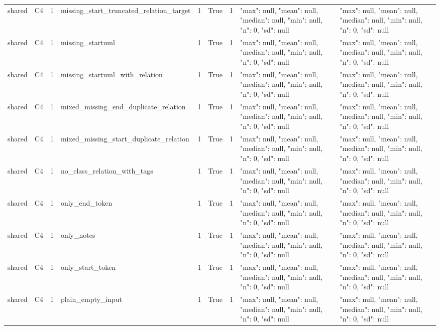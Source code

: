 \begin{tabular}{lllllllll}
shared & C4 & 1 & missing\_start\_truncated\_relation\_target & 1 & True & 1 & {"max": null, "mean": null, "median": null, "min": null, "n": 0, "sd": null} & {"max": null, "mean": null, "median": null, "min": null, "n": 0, "sd": null} \\
shared & C4 & 1 & missing\_startuml & 1 & True & 1 & {"max": null, "mean": null, "median": null, "min": null, "n": 0, "sd": null} & {"max": null, "mean": null, "median": null, "min": null, "n": 0, "sd": null} \\
shared & C4 & 1 & missing\_startuml\_with\_relation & 1 & True & 1 & {"max": null, "mean": null, "median": null, "min": null, "n": 0, "sd": null} & {"max": null, "mean": null, "median": null, "min": null, "n": 0, "sd": null} \\
shared & C4 & 1 & mixed\_missing\_end\_duplicate\_relation & 1 & True & 1 & {"max": null, "mean": null, "median": null, "min": null, "n": 0, "sd": null} & {"max": null, "mean": null, "median": null, "min": null, "n": 0, "sd": null} \\
shared & C4 & 1 & mixed\_missing\_start\_duplicate\_relation & 1 & True & 1 & {"max": null, "mean": null, "median": null, "min": null, "n": 0, "sd": null} & {"max": null, "mean": null, "median": null, "min": null, "n": 0, "sd": null} \\
shared & C4 & 1 & no\_class\_relation\_with\_tags & 1 & True & 1 & {"max": null, "mean": null, "median": null, "min": null, "n": 0, "sd": null} & {"max": null, "mean": null, "median": null, "min": null, "n": 0, "sd": null} \\
shared & C4 & 1 & only\_end\_token & 1 & True & 1 & {"max": null, "mean": null, "median": null, "min": null, "n": 0, "sd": null} & {"max": null, "mean": null, "median": null, "min": null, "n": 0, "sd": null} \\
shared & C4 & 1 & only\_notes & 1 & True & 1 & {"max": null, "mean": null, "median": null, "min": null, "n": 0, "sd": null} & {"max": null, "mean": null, "median": null, "min": null, "n": 0, "sd": null} \\
shared & C4 & 1 & only\_start\_token & 1 & True & 1 & {"max": null, "mean": null, "median": null, "min": null, "n": 0, "sd": null} & {"max": null, "mean": null, "median": null, "min": null, "n": 0, "sd": null} \\
shared & C4 & 1 & plain\_empty\_input & 1 & True & 1 & {"max": null, "mean": null, "median": null, "min": null, "n": 0, "sd": null} & {"max": null, "mean": null, "median": null, "min": null, "n": 0, "sd": null} \\

\end{tabular}

